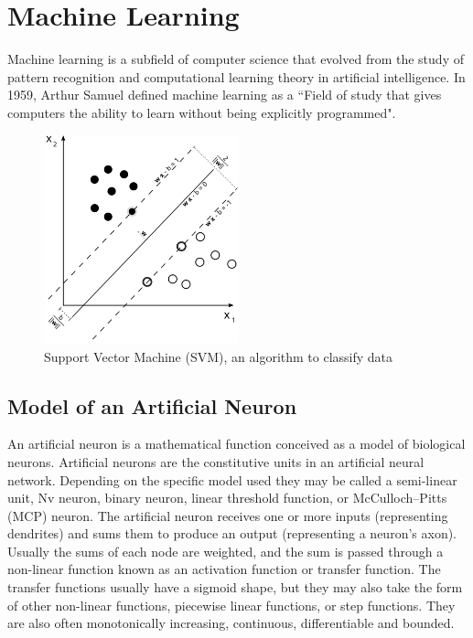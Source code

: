 \documentclass[14pt,a4paper]{extarticle}
\begin{document}
	\section{Machine Learning}
	
	Machine learning is a subfield of computer science that evolved from the study of pattern recognition and computational learning theory in artificial intelligence. In 1959, Arthur Samuel defined machine learning as a ``Field of study that gives computers the ability to learn without being explicitly programmed".
	
		\begin{figure}[H]
			\includegraphics[width=0.5\textwidth, center]{data_classification_svm.png}
			\caption{Support Vector Machine (SVM), an algorithm to classify data}
		\end{figure}
		
		
	\subsection{Model of an Artificial Neuron}
	
	An artificial neuron is a mathematical function conceived as a model of biological neurons. Artificial neurons are the constitutive units in an artificial neural network. Depending on the specific model used they may be called a semi-linear unit, Nv neuron, binary neuron, linear threshold function, or McCulloch–Pitts (MCP) neuron. The artificial neuron receives one or more inputs (representing dendrites) and sums them to produce an output (representing a neuron's axon). Usually the sums of each node are weighted, and the sum is passed through a non-linear function known as an activation function or transfer function. The transfer functions usually have a sigmoid shape, but they may also take the form of other non-linear functions, piecewise linear functions, or step functions. They are also often monotonically increasing, continuous, differentiable and bounded.
	
\end{document}
